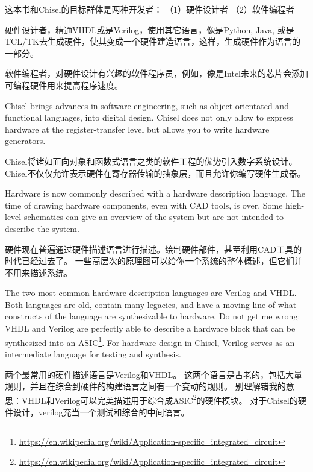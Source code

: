 \documentclass[%
    10pt,
    headinclude, footexclude,
    openright, %
    notitlepage,
    cleardoubleempty,
    headsepline,
    pointlessnumbers,
    bibtotoc, idxtotoc,
    ]{scrbook}
\newcommand{\myref}[2]{\href{#1}{#2}}
\renewcommand{\myref}[2]{{#2}{\footnote{\url{#1}}}}
\begin{document}
这本书和Chisel的目标群体是两种开发者：
（1）硬件设计者 （2）软件编程者

硬件设计者，精通VHDL或是Verilog，使用其它语言，像是Python, Java, 或是TCL/TK去生成硬件，使其变成一个硬件建造语言，这样，生成硬件作为语言的一部分。

软件编程者，对硬件设计有兴趣的软件程序员，例如，像是Intel未来的芯片会添加可编程硬件用来提高程序速度。


Chisel brings advances in software engineering, such as object-orientated
and functional languages, into digital design.
Chisel does not only allow to express hardware at the register-transfer level
but allows you to write hardware generators.

Chisel将诸如面向对象和函数式语言之类的软件工程的优势引入数字系统设计。
Chisel不仅仅允许表示硬件在寄存器传输的抽象层，而且允许你编写硬件生成器。

Hardware is now commonly described with a hardware description language.
The time of drawing hardware components, even with CAD tools, is
over. Some high-level schematics can give an overview of the system but are
not intended to describe the system.

硬件现在普遍通过硬件描述语言进行描述。绘制硬件部件，甚至利用CAD工具的时代已经过去了。
一些高层次的原理图可以给你一个系统的整体概述，但它们并不用来描述系统。

The two most common hardware description languages are Verilog and VHDL.
Both languages are old, contain many legacies, and have a moving line of what
constructs of the language are synthesizable to hardware.
Do not get me wrong: VHDL and Verilog are perfectly able to describe a hardware
block that can be synthesized into an
\myref{https://en.wikipedia.org/wiki/Application-specific_integrated_circuit}{ASIC}.
For hardware design in Chisel, Verilog serves as an intermediate language
for testing and synthesis.

两个最常用的硬件描述语言是Verilog和VHDL。
这两个语言是古老的，包括大量规则，并且在综合到硬件的构建语言之间有一个变动的规则。
别理解错我的意思：VHDL和Verilog可以完美描述用于综合成\myref{https://en.wikipedia.org/wiki/Application-specific_integrated_circuit}{ASIC}的硬件模块。
对于Chisel的硬件设计，verilog充当一个测试和综合的中间语言。
\end{document}
